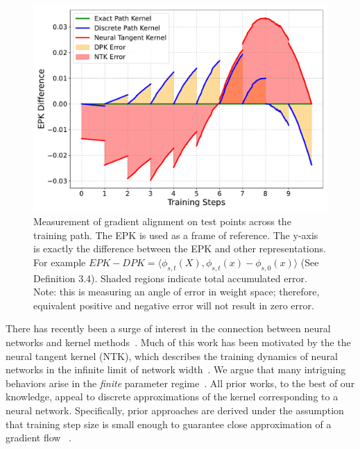 \begin{figure}[!ht]
        \centering
        \includegraphics[width=1.01\linewidth]{c4_figures/estimation_comparison.pdf}

        \caption{Measurement of gradient alignment on test points across the training path. The EPK is used as a frame of reference. The y-axis is exactly the difference between the EPK and other representations. For example $EPK-DPK = \langle \phi_{s,t}(X), \phi_{s,t}(x) - \phi_{s,0}(x) \rangle$ (See Definition 3.4). Shaded regions indicate total accumulated error. Note: this is measuring an angle of error in weight space; therefore, equivalent positive and negative error will not result in zero error.}
        \label{fig:error}
\end{figure}

There has recently been a surge of interest in the connection between neural networks and kernel methods~\cite{bietti2019bias, du2019graphntk, tancik2020fourierfeatures, abdar2021uq, geifman2020similarity, chen2020generalized, alemohammad2021recurrent}. Much of this work has been motivated by the the neural tangent kernel (NTK), which describes the training dynamics of neural networks in the infinite limit of network width~\cite{jacot2018neural}.
We argue that many intriguing behaviors arise in the \emph{finite} parameter regime~\cite{DBLP:conf/nips/BubeckS21}. 
All prior works, to the best of our knowledge, appeal to discrete approximations of the kernel corresponding to a neural network. 
Specifically, prior approaches are derived under the assumption that training step size is small enough to guarantee close approximation of a gradient flow
~\cite{ghojogh2021, shawe2004kernel, zhao2005extracting}.

